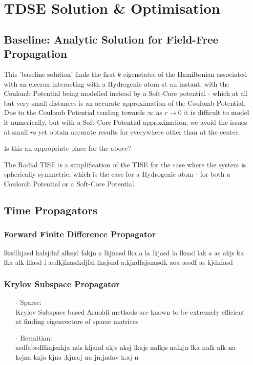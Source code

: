 
\chapter{TDSE Solution \& Optimisation} %

\label{Chapter3} %



\section{Baseline: Analytic Solution for Field-Free Propagation}
This 'baseline solution' finds the first $k$ eigenstates of the Hamiltonian associated with an elecron interacting with a Hydrogenic atom at an instant, with the Coulomb Potential being modelled instead by a Soft-Core potential - which at all but very small distances is an accurate approximation of the Coulomb Potential. Due to the Coulomb Potential tending towards $\infty$ as $r\rightarrow 0$ it is difficult to model it numerically, but with a Soft-Core Potential approximation, we avoid the issues at small $r$s yet obtain accurate results for everywhere other than at the center.

Is this an appropriate place for the above?

The Radial TISE is a simplification of the TISE for the case where the system is spherically symmetric, which is the case for a Hydrogenic atom - for both a Coulomb Potential or a Soft-Core Potential.

\section{Time Propagators}

\subsection{Forward Finite Difference Propagator}
lksdlkjasd kalsjdnf alksjd fakjn a lkjnasd lka a la lkjasd la lksad lak a
as akjs ka lka alk lllasd l
asdkjfnaslkdjfal lkajsnd a;kjndfajsnasdk aoa 
assdf as kjdnfasd

\subsection{Krylov Subspace Propagator}
\begin{itemize}
\item[-]Sparse: \\ Krylov Subspace based Arnoldi methods are known to be extremely efficient at finding eigenvectors of sparse matrices
\item[-]Hermitian: \\ asdfabsdflkajsnkja nds kljand akjs aksj lkajs nalkjs nalkjn  lka nalk  alk na ksjna knja kjna ;kjna;j na jn;jndav k;aj n
\end{itemize}

